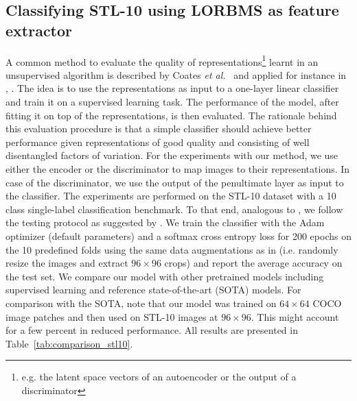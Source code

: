 \documentclass[a4paper,12pt]{report}
\begin{document}
\subsection{Classifying STL-10 using LORBMS as feature extractor}\label{subsec:linearclassifier}
A common method to evaluate the quality of representations\footnote{e.g. the latent space vectors of an autoencoder or the output of a discriminator} learnt in an unsupervised algorithm is described by Coates \textit{et al.}~\cite{singleLayerNetworks} and applied for instance in \cite{DCGAN}, \cite{AE_Interp}. The idea is to use the representations as input to a one-layer linear classifier and train it on a supervised learning task. The performance of the model, after fitting it on top of the representations, is then evaluated. The rationale behind this evaluation procedure is that a simple classifier should achieve better performance given representations of good quality and consisting of well disentangled factors of variation. For the experiments with our method, we use either the encoder or the discriminator to map images to their representations. In case of the discriminator, we use the output of the penultimate layer as input to the classifier. The experiments are performed on the STL-10 dataset with a 10 class single-label classification benchmark. To that end, analogous to \cite{SpotArtifacts}, we follow the testing protocol as suggested by \cite{singleLayerNetworks}. We train the classifier with the Adam optimizer (default parameters) and a softmax cross entropy loss for 200 epochs on the 10 predefined folds using the same data augmentations as in \cite{SpotArtifacts} (i.e. randomly resize the images and extract $96 \times 96$ crops) and report the average accuracy on the test set. We compare our model with other pretrained models including supervised learning and reference state-of-the-art (SOTA) models. For comparison with the SOTA, note that our model was trained on $64 \times 64$ COCO image patches and then used on STL-10 images at $96 \times 96$. This might account for a few percent in reduced performance. All results are presented in Table~\ref{tab:comparison_stl10}.

\end{document}
